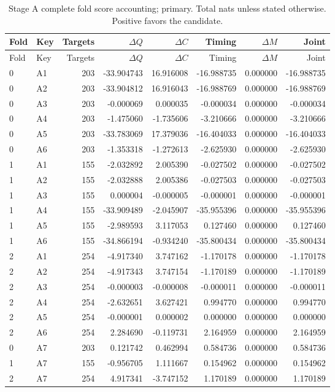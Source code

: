 {\small
\setlength{\tabcolsep}{3pt}
\begin{longtable}{llrrrrrr}
\caption{Stage A complete fold score accounting; primary. Total nats unless stated otherwise. Positive favors the candidate.}\label{tab:A-primary}\\
\toprule
Fold & Key & Targets & $\Delta Q$ & $\Delta C$ & Timing & $\Delta M$ & Joint\\\midrule
\endfirsthead
\toprule
Fold & Key & Targets & $\Delta Q$ & $\Delta C$ & Timing & $\Delta M$ & Joint\\\midrule
\endhead
0 & A1 & 203 & -33.904743 & 16.916008 & -16.988735 & 0.000000 & -16.988735\\
0 & A2 & 203 & -33.904812 & 16.916043 & -16.988769 & 0.000000 & -16.988769\\
0 & A3 & 203 & -0.000069 & 0.000035 & -0.000034 & 0.000000 & -0.000034\\
0 & A4 & 203 & -1.475060 & -1.735606 & -3.210666 & 0.000000 & -3.210666\\
0 & A5 & 203 & -33.783069 & 17.379036 & -16.404033 & 0.000000 & -16.404033\\
0 & A6 & 203 & -1.353318 & -1.272613 & -2.625930 & 0.000000 & -2.625930\\
1 & A1 & 155 & -2.032892 & 2.005390 & -0.027502 & 0.000000 & -0.027502\\
1 & A2 & 155 & -2.032888 & 2.005386 & -0.027503 & 0.000000 & -0.027503\\
1 & A3 & 155 & 0.000004 & -0.000005 & -0.000001 & 0.000000 & -0.000001\\
1 & A4 & 155 & -33.909489 & -2.045907 & -35.955396 & 0.000000 & -35.955396\\
1 & A5 & 155 & -2.989593 & 3.117053 & 0.127460 & 0.000000 & 0.127460\\
1 & A6 & 155 & -34.866194 & -0.934240 & -35.800434 & 0.000000 & -35.800434\\
2 & A1 & 254 & -4.917340 & 3.747162 & -1.170178 & 0.000000 & -1.170178\\
2 & A2 & 254 & -4.917343 & 3.747154 & -1.170189 & 0.000000 & -1.170189\\
2 & A3 & 254 & -0.000003 & -0.000008 & -0.000011 & 0.000000 & -0.000011\\
2 & A4 & 254 & -2.632651 & 3.627421 & 0.994770 & 0.000000 & 0.994770\\
2 & A5 & 254 & -0.000001 & 0.000002 & 0.000000 & 0.000000 & 0.000000\\
2 & A6 & 254 & 2.284690 & -0.119731 & 2.164959 & 0.000000 & 2.164959\\
0 & A7 & 203 & 0.121742 & 0.462994 & 0.584736 & 0.000000 & 0.584736\\
1 & A7 & 155 & -0.956705 & 1.111667 & 0.154962 & 0.000000 & 0.154962\\
2 & A7 & 254 & 4.917341 & -3.747152 & 1.170189 & 0.000000 & 1.170189\\
\bottomrule
\end{longtable}
}


